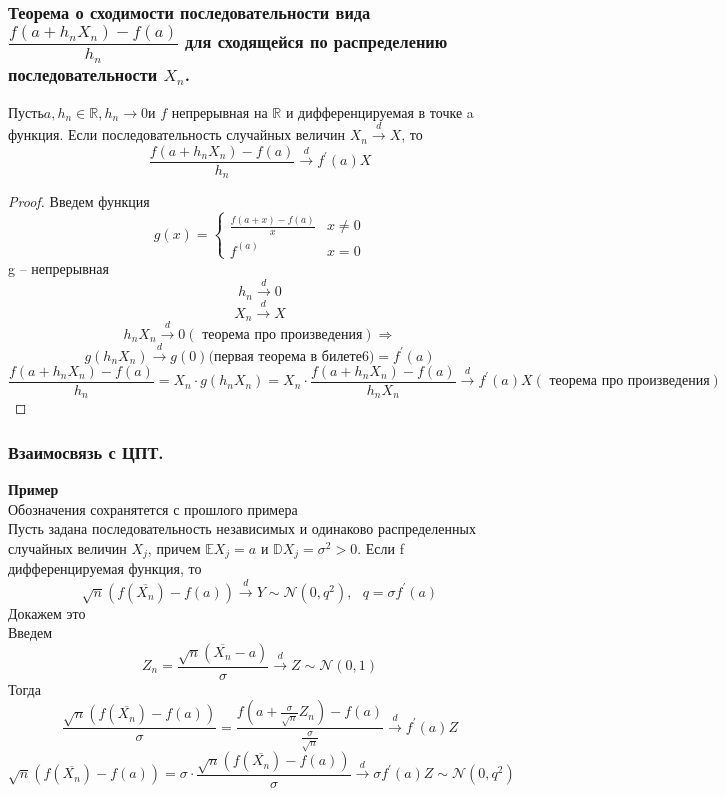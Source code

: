 	\subsubsection{Теорема о сходимости последовательности вида $\dfrac{f(a + h_n X_n) - f(a)}{h_n}$ для сходящейся по распределению последовательности $X_n$. }
	\begin{theorem*}
		Пусть$  a, h_n \in \mathbb{R}, h_n\to0 $и $ f $ непрерывная на $ \mathbb{R} $ и дифференцируемая в точке a функция. Если последовательность случайных величин $ X_n \xrightarrow{d} X $, то
		$$\frac{f(a + h_nX_n) - f(a)}{h_n}\xrightarrow{d}f^{'}(a)X$$
	\end{theorem*}
	\begin{proof}
		Введем функция
		\begin{equation*}
			g(x) = 
			\begin{cases}
				\frac{f(a + x) - f(a)}{x} & x\neq 0\\
				f^(a) & x = 0
			\end{cases}
		\end{equation*}
		g -- непрерывная
		$$h_n\xrightarrow{d} 0$$
		$$X_n\xrightarrow{d}X$$
		$$h_nX_n\xrightarrow{d}0(\text{ теорема про произведения})\Rightarrow$$
		$$g(h_nX_n)\xrightarrow{d}g(0)\text{(первая теорема в билете6)} = f^{'}(a)$$
		$$\frac{f(a + h_nX_n) - f(a)}{h_n} = X_n\cdot g(h_nX_n) = X_n\cdot\frac{f(a + h_nX_n) - f(a)}{h_nX_n} \xrightarrow{d}f^{'}(a)X(\text{ теорема про произведения})$$
	\end{proof}
	\subsubsection{Взаимосвязь с ЦПТ.}
	\textbf{Пример}\\
	Обозначения сохранятется с прошлого примера\\
	Пусть задана последовательность независимых и одинаково распределенных
	случайных величин $ X_j $, причем $  \mathbb{E}X_j = a$ и $\mathbb{D}X_j = \sigma^2 > 0 $. Если f дифференцируемая функция, то
	$$\sqrt{n}(f(\overline{X_n}) - f(a))\xrightarrow{d}Y\sim\mathcal{N}(0, q^2),\text{ }q=\sigma f^{'}(a)$$
	Докажем это\\
	Введем
	$$ Z_n = \frac{\sqrt{n}(\overline{X_n} - a)}{\sigma}\xrightarrow{d}Z\sim\mathcal{N}(0,1)$$
	Тогда
	$$\frac{\sqrt{n}(f(\overline{X_n}) - f(a))}{\sigma} = \frac{f(a + \frac{\sigma}{\sqrt{n}} Z_n) - f(a)}{\frac{\sigma}{\sqrt{n}}}\xrightarrow{d}f^{'}(a)Z$$
	$$\sqrt{n}(f(\overline{X_n}) - f(a)) = \sigma \cdot \frac{\sqrt{n}(f(\overline{X_n}) - f(a))}{\sigma}\xrightarrow{d}\sigma f^{'}(a)Z\sim \mathcal{N}(0, q^2)$$
